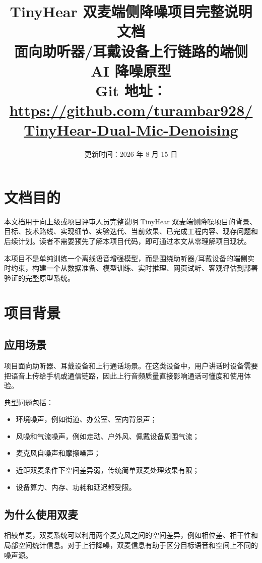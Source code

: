 \documentclass[UTF8,12pt,a4paper]{ctexart}
\title{\textbf{TinyHear 双麦端侧降噪项目完整说明文档}\\
\large 面向助听器/耳戴设备上行链路的端侧 AI 降噪原型\\
\large Git 地址：\url{https://github.com/turambar928/TinyHear-Dual-Mic-Denoising}}
\author{}
\date{更新时间：2026 年 8 月 15 日}
\begin{document}
\maketitle
\tableofcontents
\newpage

\section{文档目的}

本文档用于向上级或项目评审人员完整说明 TinyHear 双麦端侧降噪项目的背景、目标、技术路线、实现细节、实验迭代、当前效果、已完成工程内容、现存问题和后续计划。读者不需要预先了解本项目代码，即可通过本文从零理解项目现状。

本项目不是单纯训练一个离线语音增强模型，而是围绕助听器/耳戴设备的端侧实时约束，构建一个从数据准备、模型训练、实时推理、网页试听、客观评估到部署验证的完整原型系统。

\section{项目背景}

\subsection{应用场景}

项目面向助听器、耳戴设备和上行通话场景。在这类设备中，用户讲话时设备需要把语音上传给手机或通信链路，因此上行音频质量直接影响通话可懂度和使用体验。

典型问题包括：

\begin{itemize}
  \item 环境噪声，例如街道、办公室、室内背景声；
  \item 风噪和气流噪声，例如走动、户外风、佩戴设备周围气流；
  \item 麦克风自噪声和摩擦噪声；
  \item 近距双麦条件下空间差异弱，传统简单双麦处理效果有限；
  \item 设备算力、内存、功耗和延迟都受限。
\end{itemize}

\subsection{为什么使用双麦}

相较单麦，双麦系统可以利用两个麦克风之间的空间差异，例如相位差、相干性和局部空间统计信息。对于上行降噪，双麦信息有助于区分目标语音和空间上不同的噪声源。
\end{document}
